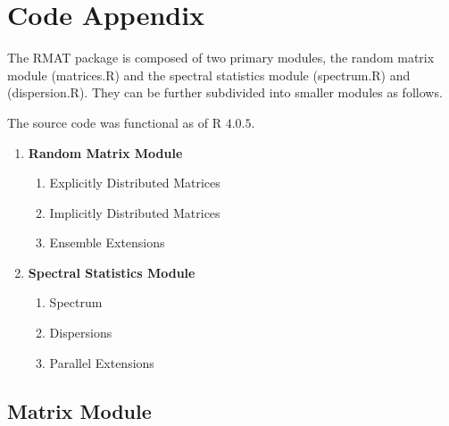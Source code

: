 
\chapter{Code Appendix}


\noindent
The RMAT package is composed of two primary modules, the random matrix module (matrices.R) and the spectral statistics module (spectrum.R) and (dispersion.R).
They can be further subdivided into smaller modules as follows.

 The source code was functional as of R $4.0.5$.

\begin{enumerate}
  \item \textbf{Random Matrix Module}
    \begin{enumerate}
      \item Explicitly Distributed Matrices
      \item Implicitly Distributed Matrices
      \item Ensemble Extensions
    \end{enumerate}

  \item \textbf{Spectral Statistics Module}
    \begin{enumerate}
      \item Spectrum
      \item Dispersions
      \item Parallel Extensions
    \end{enumerate}
\end{enumerate}

\newpage
\section{Matrix Module}


